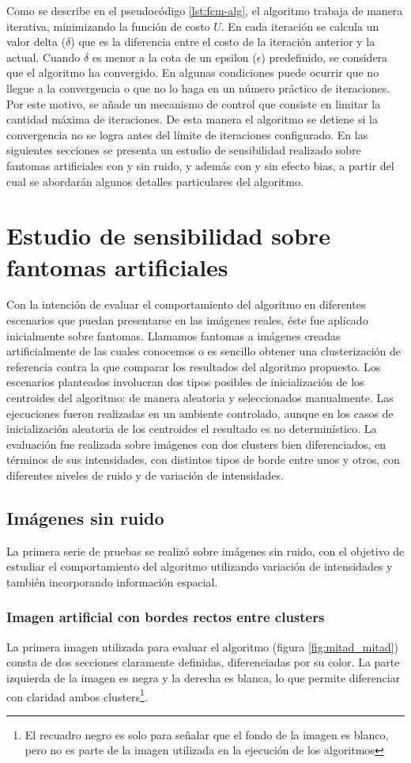 Como se describe en el pseudocódigo \ref{lst:fcm-alg}, el algoritmo trabaja de manera iterativa, minimizando la función de costo $U$. En cada iteración se calcula un valor delta ($\delta$) que es la diferencia entre el costo de la iteración anterior y la actual. Cuando $\delta$ es menor a la cota de un epsilon ($\epsilon$) predefinido, se considera que el algoritmo ha convergido. En algunas condiciones puede ocurrir que no llegue a la convergencia o que no lo haga en un número práctico de iteraciones. Por este motivo, se añade un mecanismo de control que consiste en limitar la cantidad máxima de iteraciones. De esta manera el algoritmo se detiene si la convergencia no se logra antes del límite de iteraciones configurado.
En las siguientes secciones se presenta un estudio de sensibilidad realizado sobre fantomas artificiales con y sin ruido, y además con y sin efecto bias, a partir del cual se abordarán algunos detalles particulares del algoritmo.

\section{Estudio de sensibilidad sobre fantomas artificiales}
Con la intención de evaluar el comportamiento del algoritmo en diferentes escenarios que puedan presentarse en las imágenes reales, éste fue aplicado inicialmente sobre fantomas. Llamamos fantomas a imágenes creadas artificialmente de las cuales conocemos o es sencillo obtener una clusterización de referencia contra la que comparar los resultados del algoritmo propuesto. Los escenarios planteados involucran dos tipos posibles de inicialización de los centroides del algoritmo: de manera aleatoria y seleccionados manualmente. Las ejecuciones fueron realizadas en un ambiente controlado, aunque en los casos de inicialización aleatoria de los centroides el resultado es no determinístico. La evaluación fue realizada sobre imágenes con dos clusters bien diferenciados, en términos de sus intensidades, con distintos tipos de borde entre unos y otros, con diferentes niveles de ruido y de variación de intensidades.

\subsection{Imágenes sin ruido}
La primera serie de pruebas se realizó sobre imágenes sin ruido, con el objetivo de estudiar el comportamiento del algoritmo utilizando variación de intensidades y también incorporando información espacial.
\subsubsection{Imagen artificial con bordes rectos entre clusters}
La primera imagen utilizada para evaluar el algoritmo (figura \ref{fig:mitad_mitad})  consta de dos secciones claramente definidas, diferenciadas por su color. La parte izquierda de la imagen es negra y la derecha es blanca, lo que permite diferenciar con claridad ambos clusters\footnote{El recuadro negro es solo para señalar que el fondo de la imagen es blanco, pero no es parte de la imagen utilizada en la ejecución de los algoritmos}.


